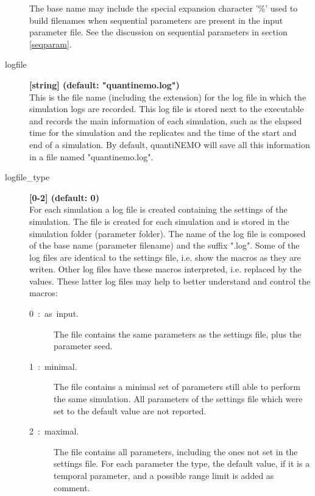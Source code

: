 \documentclass[letterpaper,12pt,oneside]{book}
\begin{document}
\begin{description}
The base name may include the special expansion character '\%' used to build filenames when sequential parameters are present in the input parameter file. See the discussion on sequential parameters in section \ref{seqparam}. 

\item[logfile\index{logfile}] \textbf{[string] (default: "quantinemo.log")}\\
This is the file name (including the extension) for the log file in which the simulation logs are recorded. This log file is stored next to the executable and records the main information of each simulation, such as the elapsed time for the simulation and the replicates and the time of the start and end of a simulation. By default, quantiNEMO will save all this information in a file named "quantinemo.log".

\item[logfile\_type\index{logfile\_type}] \textbf{[0-2] (default: 0)}\\
For each simulation a log file is created containing the settings of the simulation. The file is created for each simulation and is stored in the simulation folder (parameter \textsf{folder}). The name of the log file is composed of the base name (parameter \textsf{filename}) and the suffix ".log". Some of the log files are identical to the settings file, i.e. show the macros as they are writen. Other log files have these macros interpreted, i.e. replaced by the values. These latter log files may help to better understand and control the macros:
\begin{description}
\item[0~:~as~input.] The file contains the same parameters as the settings file, plus the parameter \textsf{seed}.
\item[1~:~minimal.] The file contains a minimal set of parameters still able to perform the same simulation. All parameters of the settings file which were set to the default value are not reported. 
\item[2~:~maximal.] The file contains all parameters, including the ones not set in the settings file. For each parameter the type, the default value, if it is a temporal parameter, and a possible range limit is added as comment.
\end{description}


\end{description}
\end{document}
